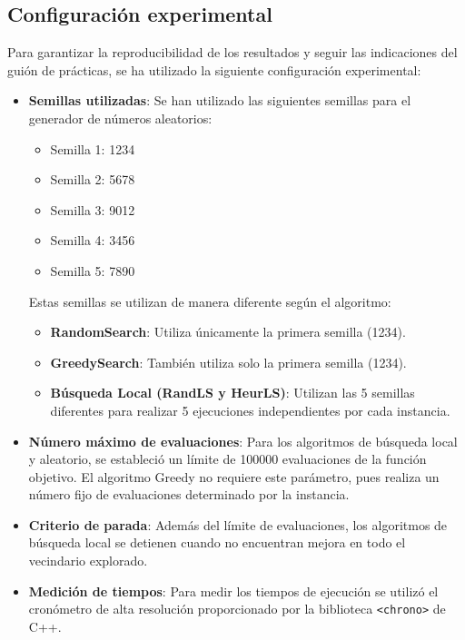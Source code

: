 \documentclass{article}
\begin{document}
\subsection{Configuración experimental}

Para garantizar la reproducibilidad de los resultados y seguir las indicaciones del guión de prácticas, se ha utilizado la siguiente configuración experimental:

\begin{itemize}
    \item \textbf{Semillas utilizadas}: Se han utilizado las siguientes semillas para el generador de números aleatorios:
    \begin{itemize}
        \item Semilla 1: 1234
        \item Semilla 2: 5678
        \item Semilla 3: 9012
        \item Semilla 4: 3456
        \item Semilla 5: 7890
    \end{itemize}
    
    Estas semillas se utilizan de manera diferente según el algoritmo:
    \begin{itemize}
        \item \textbf{RandomSearch}: Utiliza únicamente la primera semilla (1234).
        \item \textbf{GreedySearch}: También utiliza solo la primera semilla (1234).
        \item \textbf{Búsqueda Local (RandLS y HeurLS)}: Utilizan las 5 semillas diferentes para realizar 5 ejecuciones independientes por cada instancia.
    \end{itemize}
    
    \item \textbf{Número máximo de evaluaciones}: Para los algoritmos de búsqueda local y aleatorio, se estableció un límite de 100000 evaluaciones de la función objetivo. El algoritmo Greedy no requiere este parámetro, pues realiza un número fijo de evaluaciones determinado por la instancia.
    
    \item \textbf{Criterio de parada}: Además del límite de evaluaciones, los algoritmos de búsqueda local se detienen cuando no encuentran mejora en todo el vecindario explorado.
    
    \item \textbf{Medición de tiempos}: Para medir los tiempos de ejecución se utilizó el cronómetro de alta resolución proporcionado por la biblioteca \texttt{<chrono>} de C++.
\end{itemize}
\end{document}
